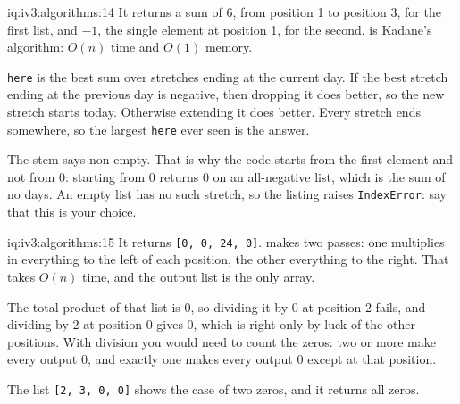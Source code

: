 \begin{solution}{iq:iv3:algorithms:14}
It returns a sum of 6, from position 1 to position 3, for the first list, and $-1$, the single element at position 1, for the second.  is Kadane's algorithm: $O(n)$ time and $O(1)$ memory.
\label{lst:iv3:al:kadane}

\texttt{here} is the best sum over stretches ending at the current day. If the best stretch ending at the previous day is negative, then dropping it does better, so the new stretch starts today. Otherwise extending it does better. Every stretch ends somewhere, so the largest \texttt{here} ever seen is the answer.

The stem says non-empty. That is why the code starts from the first element and not from 0: starting from 0 returns 0 on an all-negative list, which is the sum of no days. An empty list has no such stretch, so the listing raises \texttt{IndexError}: say that this is your choice.

\end{solution}

\begin{solution}{iq:iv3:algorithms:15}
It returns \texttt{[0, 0, 24, 0]}.  makes two passes: one multiplies in everything to the left of each position, the other everything to the right. That takes $O(n)$ time, and the output list is the only array.
\label{lst:iv3:al:product}

The total product of that list is 0, so dividing it by 0 at position 2 fails, and dividing by 2 at position 0 gives 0, which is right only by luck of the other positions. With division you would need to count the zeros: two or more make every output 0, and exactly one makes every output 0 except at that position.

The list \texttt{[2, 3, 0, 0]} shows the case of two zeros, and it returns all zeros.

\end{solution}

